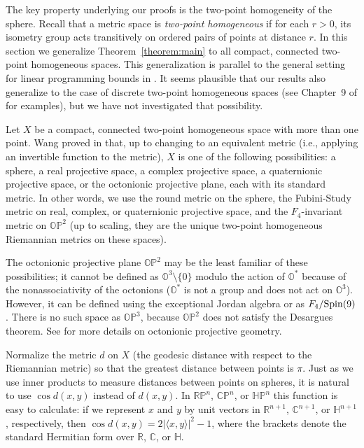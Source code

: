 \documentclass{jams-l}
\theoremstyle{plain}
\numberwithin{theorem}{section}
\theoremstyle{definition}
\numberwithin{equation}{section}
\newcommand{\R}{{\mathbb R}}
\newcommand{\C}{{\mathbb C}}
\newcommand{\Oc}{{\mathbb O}}
\newcommand{\Ha}{{\mathbb H}}
\newcommand{\Proj}{{\mathbb P}}
\begin{document}
The key property underlying our proofs is the two-point
homogeneity of the sphere. Recall that a metric space is
\textit{two-point homogeneous\/} if for each $r>0$, its isometry
group acts transitively on ordered pairs of points at distance
$r$.  In this section we generalize Theorem~\ref{theorem:main} to
all compact, connected two-point homogeneous spaces.  This
generalization is parallel to the general setting for linear
programming bounds in \cite{CS,L2,L3}. It seems plausible that our
results also generalize to the case of discrete two-point
homogeneous spaces (see Chapter~9 of \cite{CS} for examples), but
we have not investigated that possibility.

Let $X$ be a compact, connected two-point homogeneous space with
more than one point. Wang proved in \cite{Wa} that, up to changing
to an equivalent metric (i.e., applying an invertible function to
the metric), $X$ is one of the following possibilities: a sphere,
a real projective space, a complex projective space, a
quaternionic projective space, or the octonionic projective plane,
each with its standard metric.  In other words, we use the round
metric on the sphere, the Fubini-Study metric on real, complex, or
quaternionic projective space, and the $F_4$-invariant metric on
$\Oc\Proj^2$ (up to scaling, they are the unique two-point
homogeneous Riemannian metrics on these spaces).

The octonionic projective plane $\Oc\Proj^2$ may be the least
familiar of these possibilities; it cannot be defined as
$\Oc^3\setminus\{0\}$ modulo the action of $\Oc^*$ because of the
nonassociativity of the octonions ($\Oc^*$ is not a group and
does not act on $\Oc^3$). However, it can be defined using the
exceptional Jordan algebra or as $F_4/\textup{Spin}(9)$. There is
no such space as $\Oc\Proj^3$, because $\Oc\Proj^2$ does not
satisfy the Desargues theorem.  See \cite{Ba} for more details on
octonionic projective geometry.

Normalize the metric $d$ on $X$ (the geodesic distance with
respect to the Riemannian metric) so that the greatest distance
between points is $\pi$. Just as we use inner products to measure
distances between points on spheres, it is natural to use $\cos
d(x,y)$ instead of $d(x,y)$.  In $\R\Proj^n$, $\C\Proj^n$, or
$\Ha\Proj^n$ this function is easy to calculate: if we represent
$x$ and $y$ by unit vectors in $\R^{n+1}$, $\C^{n+1}$, or
$\Ha^{n+1}$, respectively, then $\cos d(x,y) = 2|\langle x,y
\rangle|^2-1$, where the brackets denote the standard Hermitian
form over $\R$, $\C$, or $\Ha$.
\end{document}
